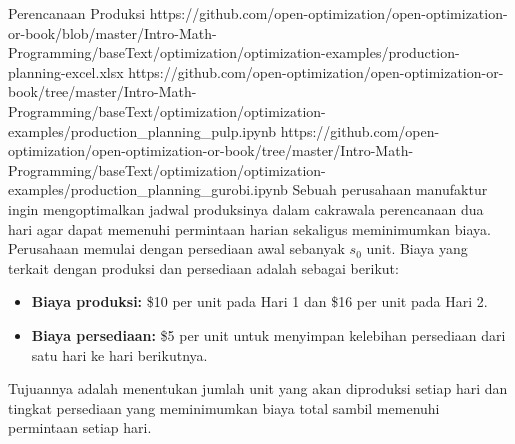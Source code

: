 \Needspace{0.56\textheight}
\begin{examplewithallcode}{Perencanaan Produksi}
{https://github.com/open-optimization/open-optimization-or-book/blob/master/Intro-Math-Programming/baseText/optimization/optimization-examples/production-planning-excel.xlsx}
{https://github.com/open-optimization/open-optimization-or-book/tree/master/Intro-Math-Programming/baseText/optimization/optimization-examples/production_planning_pulp.ipynb}
{https://github.com/open-optimization/open-optimization-or-book/tree/master/Intro-Math-Programming/baseText/optimization/optimization-examples/production_planning_gurobi.ipynb}
\label{example:production-planning}
Sebuah perusahaan manufaktur ingin mengoptimalkan jadwal produksinya dalam cakrawala perencanaan dua hari agar dapat memenuhi permintaan harian sekaligus meminimumkan biaya. Perusahaan memulai dengan persediaan awal sebanyak \( s_0 \) unit. Biaya yang terkait dengan produksi dan persediaan adalah sebagai berikut:

\begin{itemize}
    \item \textbf{Biaya produksi:} \$10 per unit pada Hari 1 dan \$16 per unit pada Hari 2.
    \item \textbf{Biaya persediaan:} \$5 per unit untuk menyimpan kelebihan persediaan dari satu hari ke hari berikutnya.
\end{itemize}

\par{}\label{fig:modeling-linear-programming-tikz01}%


Tujuannya adalah menentukan jumlah unit yang akan diproduksi setiap hari dan tingkat persediaan yang meminimumkan biaya total sambil memenuhi permintaan setiap hari.

\end{examplewithallcode}

